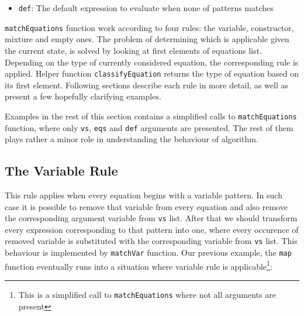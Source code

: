 \documentclass[12pt,a4paper]{report}
\begin{document}
\begin{itemize}
\vspace*{0.2in}
\begin{lstlisting}[style=haskell]
ECaseConstr ((EConstr 3 2 (ENum 1)) (EConstr 2 0))
            [(PConstr 2 0 [], ENum 0),
             (PConstr 3 2 [PVar x, PVar xs], EVar x)]
\end{lstlisting}

\texttt{Pattern} type instances on the other hand represents patterns itself.
Patterns might be numbers, variables, constructors or special entities standing
for patterns chosen when none of other branches match. Below, the definition of
\texttt{Pattern} type is presented:

\vspace*{0.2in}
\begin{lstlisting}[style=haskell]
data Pattern = PNum Int
             | PVar Name
             | PChar Int
             | PConstrName Name [Pattern]
             | PConstr Int Int [Pattern]
             | PDefault
\end{lstlisting}


  \item \texttt{def}: The default expression to evaluate when none of patterns
    matches
\end{itemize}

\texttt{matchEquations} function work according to four rules: the variable,
constructor, mixture and empty ones. The problem of determining which is
applicable given the current state, is solved by looking at first elements of
equations list. Depending on the type of currently considered equation, the
corresponding rule is applied. Helper function \texttt{classifyEquation}
returns the type of equation based on its first element. Following sections
describe each rule in more detail, as well as present a few hopefully
clarifying examples.

Examples in the rest of this section contains a simplified calls to
\texttt{matchEquations} function, where only \texttt{vs}, \texttt{eqs} and
\texttt{def} arguments are presented. The rest of them plays rather a minor
role in understanding the behaviour of algorithm.


\subsection{The Variable Rule}
This rule applies when every equation begins with a variable pattern. In such
case it is possible to remove that variable from every equation and also remove
the corresponding argument variable from \texttt{vs} list. After that we should
transform every expression corresponding to that pattern into one, where every
occurence of removed variable is substituted with the corresponding variable
from \texttt{vs} list. This behaviour is implemented by \texttt{matchVar}
function.
Our previous example, the \texttt{map} function eventually runs into a situation
where variable rule is applicable\footnote{This is a simplified call to
\texttt{matchEquations} where not all arguments are present}:
\end{document}
